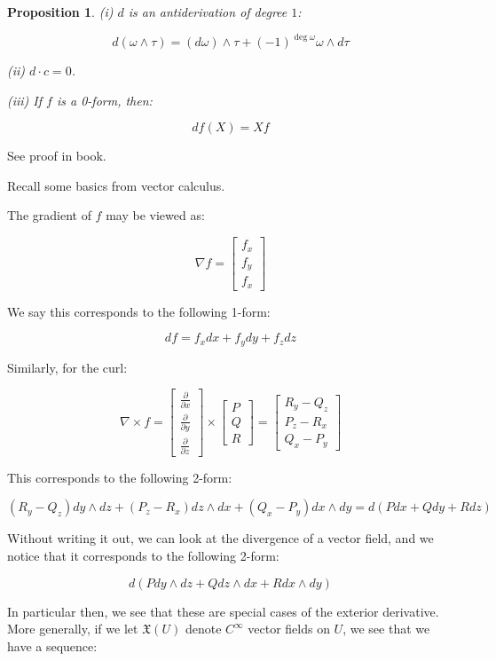\documentclass[10pt]{article}
\newtheorem{proposition}{Proposition}[section]
\begin{document}
\begin{proposition}
(i) $d$ is an antiderivation of degree $1$:

$$ d(\omega \wedge \tau) = (d\omega) \wedge \tau + (-1)^{\deg \omega} \omega \wedge d\tau $$

(ii) $d \cdot c = 0$.

(iii) If $f$ is a 0-form, then:

$$ df(X) = Xf $$
\end{proposition}

See proof in book.

Recall some basics from vector calculus.

The gradient of $f$ may be viewed as:

$$\nabla f = \begin{bmatrix} f_x \\ f_y \\ f_x  \end{bmatrix}$$

We say this corresponds to the following 1-form:

$$df = f_x dx + f_y dy + f_z dz $$

Similarly, for the curl:

$$ \nabla \times f = \begin{bmatrix} \frac{\partial}{\partial x} \\ \frac{\partial}{\partial y} \\ \frac{\partial}{\partial z} \end{bmatrix} \times \begin{bmatrix} P \\ Q \\ R \end{bmatrix} = \begin{bmatrix} R_y - Q_z \\ P_z - R_x \\ Q_x - P_y \end{bmatrix} $$

This corresponds to the following 2-form:

$$(R_y - Q_z) dy \wedge dz + (P_z - R_x) dz \wedge dx + (Q_x - P_y) dx \wedge dy = d(P dx + Q dy + R dz) $$

Without writing it out, we can look at the divergence of a vector field, and we notice that it corresponds to the following 2-form:

$$d(P dy \wedge dz + Q dz \wedge dx + R dx \wedge dy) $$

In particular then, we see that these are special cases of the exterior derivative. More generally, if we let $\mathfrak{X}(U)$ denote $C^\infty$ vector fields on $U$, we see that we have a sequence:
\end{document}
